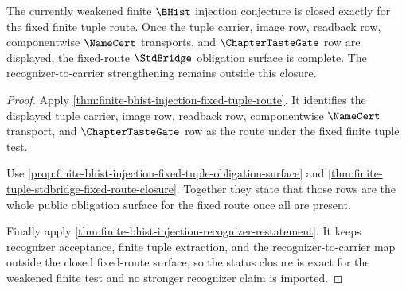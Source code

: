 \begin{theorem}
\label{thm:finite-bhist-injection-weakened-status-closure}
The currently weakened finite $\BHist$ injection conjecture is closed exactly for the fixed finite tuple route. Once the tuple carrier, image row, readback row, componentwise $\NameCert$ transports, and $\ChapterTasteGate$ row are displayed, the fixed-route $\StdBridge$ obligation surface is complete. The recognizer-to-carrier strengthening remains outside this closure.
\end{theorem}
\begin{proof}
Apply \autoref{thm:finite-bhist-injection-fixed-tuple-route}. It identifies the displayed tuple carrier, image row, readback row, componentwise $\NameCert$ transport, and $\ChapterTasteGate$ row as the route under the fixed finite tuple test.

Use \autoref{prop:finite-bhist-injection-fixed-tuple-obligation-surface} and \autoref{thm:finite-tuple-stdbridge-fixed-route-closure}. Together they state that those rows are the whole public obligation surface for the fixed route once all are present.

Finally apply \autoref{thm:finite-bhist-injection-recognizer-restatement}. It keeps recognizer acceptance, finite tuple extraction, and the recognizer-to-carrier map outside the closed fixed-route surface, so the status closure is exact for the weakened finite test and no stronger recognizer claim is imported.
\end{proof}

